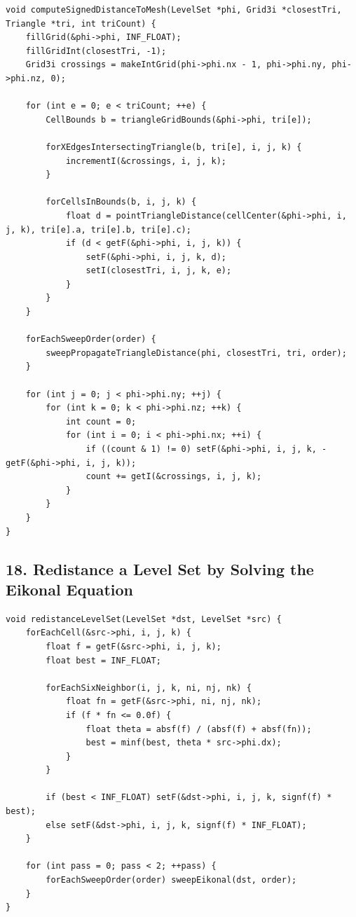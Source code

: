 \documentclass[10pt,letterpaper]{article}
\begin{document}
\begin{verbatim}
void computeSignedDistanceToMesh(LevelSet *phi, Grid3i *closestTri, Triangle *tri, int triCount) {
    fillGrid(&phi->phi, INF_FLOAT);
    fillGridInt(closestTri, -1);
    Grid3i crossings = makeIntGrid(phi->phi.nx - 1, phi->phi.ny, phi->phi.nz, 0);

    for (int e = 0; e < triCount; ++e) {
        CellBounds b = triangleGridBounds(&phi->phi, tri[e]);

        forXEdgesIntersectingTriangle(b, tri[e], i, j, k) {
            incrementI(&crossings, i, j, k);
        }

        forCellsInBounds(b, i, j, k) {
            float d = pointTriangleDistance(cellCenter(&phi->phi, i, j, k), tri[e].a, tri[e].b, tri[e].c);
            if (d < getF(&phi->phi, i, j, k)) {
                setF(&phi->phi, i, j, k, d);
                setI(closestTri, i, j, k, e);
            }
        }
    }

    forEachSweepOrder(order) {
        sweepPropagateTriangleDistance(phi, closestTri, tri, order);
    }

    for (int j = 0; j < phi->phi.ny; ++j) {
        for (int k = 0; k < phi->phi.nz; ++k) {
            int count = 0;
            for (int i = 0; i < phi->phi.nx; ++i) {
                if ((count & 1) != 0) setF(&phi->phi, i, j, k, -getF(&phi->phi, i, j, k));
                count += getI(&crossings, i, j, k);
            }
        }
    }
}
\end{verbatim}

\subsection*{18. Redistance a Level Set by Solving the Eikonal Equation}

\begin{verbatim}
void redistanceLevelSet(LevelSet *dst, LevelSet *src) {
    forEachCell(&src->phi, i, j, k) {
        float f = getF(&src->phi, i, j, k);
        float best = INF_FLOAT;

        forEachSixNeighbor(i, j, k, ni, nj, nk) {
            float fn = getF(&src->phi, ni, nj, nk);
            if (f * fn <= 0.0f) {
                float theta = absf(f) / (absf(f) + absf(fn));
                best = minf(best, theta * src->phi.dx);
            }
        }

        if (best < INF_FLOAT) setF(&dst->phi, i, j, k, signf(f) * best);
        else setF(&dst->phi, i, j, k, signf(f) * INF_FLOAT);
    }

    for (int pass = 0; pass < 2; ++pass) {
        forEachSweepOrder(order) sweepEikonal(dst, order);
    }
}
\end{verbatim}
\end{document}
